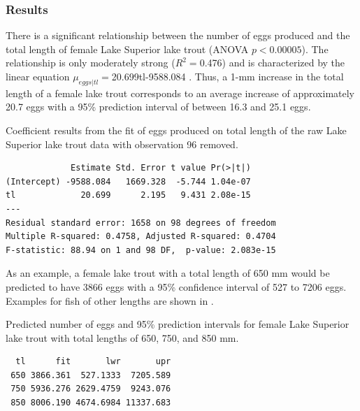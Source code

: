 \documentclass[10pt,openany]{book}\usepackage[]{graphicx}\usepackage[]{color}
\makeatletter
\newenvironment{kframe}{%
 \def\at@end@of@kframe{}%
 \ifinner\ifhmode%
  \def\at@end@of@kframe{\end{minipage}}%
  \begin{minipage}{\columnwidth}%
 \fi\fi%
 \def\FrameCommand##1{\hskip\@totalleftmargin \hskip-\fboxsep
 \colorbox{shadecolor}{##1}\hskip-\fboxsep
     \hskip-\linewidth \hskip-\@totalleftmargin \hskip\columnwidth}%
 \MakeFramed {\advance\hsize-\width
   \@totalleftmargin\z@ \linewidth\hsize
   \@setminipage}}%
 {\par\unskip\endMakeFramed%
 \at@end@of@kframe}
\newenvironment{knitrout}{}{} %
\makeatother
\begin{document}
\subsubsection*{Results}
There is a significant relationship between the number of eggs produced and the total length of female Lake Superior lake trout (ANOVA $p<0.00005$).  The relationship is only moderately strong ($R^{2}=$0.476) and is characterized by the linear equation $\mu_{eggs|tl}=$20.699tl-9588.084 .  Thus, a 1-mm increase in the total length of a female lake trout corresponds to an average increase of approximately 20.7 eggs with a 95\% prediction interval of between 16.3 and 25.1 eggs.

\begin{table}[h]
  \centering
  \caption{Coefficient results from the fit of eggs produced on total length of the raw Lake Superior lake trout data with observation 96 removed.}\label{tab:SLRLTResults3}
\begin{knitrout}
\color{fgcolor}\begin{kframe}
\begin{verbatim}
             Estimate Std. Error t value Pr(>|t|)
(Intercept) -9588.084   1669.328  -5.744 1.04e-07
tl             20.699      2.195   9.431 2.08e-15
---
Residual standard error: 1658 on 98 degrees of freedom
Multiple R-squared: 0.4758,	Adjusted R-squared: 0.4704 
F-statistic: 88.94 on 1 and 98 DF,  p-value: 2.083e-15 
\end{verbatim}
\end{kframe}
\end{knitrout}
\end{table}


As an example, a female lake trout with a total length of 650 mm would be predicted to have 3866 eggs with a 95\% confidence interval of 527 to 7206 eggs.  Examples for fish of other lengths are shown in .

\begin{table}[h]
  \centering
  \caption{Predicted number of eggs and 95\% prediction intervals for female Lake Superior lake trout with total lengths of 650, 750, and 850 mm.}\label{tab:SLRLTResults4}
\begin{knitrout}
\color{fgcolor}\begin{kframe}
\begin{verbatim}
  tl      fit       lwr       upr
 650 3866.361  527.1333  7205.589
 750 5936.276 2629.4759  9243.076
 850 8006.190 4674.6984 11337.683
\end{verbatim}
\end{kframe}
\end{knitrout}
\end{table}
\end{document}
